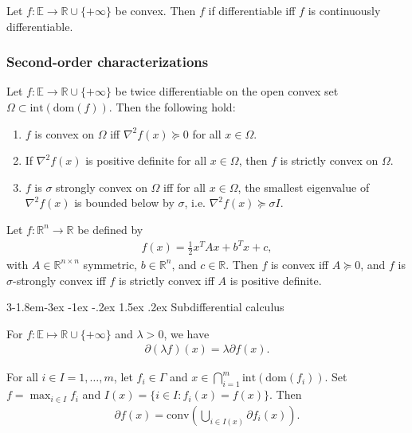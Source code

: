 \documentclass{tufte-handout}
\makeatletter
\renewcommand{\subsection}{\@startsection{subsection}%
    {3}{-1.8em}{-3ex \@plus -1ex \@minus -.2ex}%
    {1.5ex \@plus .2ex}
    {\hspace*{-5.5em}\fcolorbox{ltblue}{ltblue}{\parbox[c][1.0ex][b]{4em}{\phantom{space}}}
    \normalfont\large\itshape\color{ltblue}}}
\makeatother
\begin{document}
\begin{Corollary}
    Let \( f: \mathbb{E}\to \mathbb{R} \cup \{+\infty\} \) be convex. Then \( f \) 
    if differentiable iff \( f \) is continuously differentiable.
\end{Corollary}

\subsubsection{Second-order characterizations}
\begin{Theorem}
    Let \( f: \mathbb{E}\to \mathbb{R} \cup \{+\infty\} \) be twice differentiable 
    on the open convex set \( \Omega \subset \text{int}(\text{dom}(f)) \).
    Then the following hold:
    \begin{enumerate}
        \item \( f \) is convex on \( \Omega \) iff \( \nabla^2 f(x) \succeq 0 \) for all \( x \in \Omega \).
        \item If \( \nabla^2 f(x) \) is positive definite for all \( x \in \Omega \), then \( f \) is strictly convex on \( \Omega \).
        \item \( f \) is \( \sigma \) strongly convex on \( \Omega \) iff for all \( x \in \Omega \), 
        the smallest eigenvalue of \( \nabla^2 f(x) \) is bounded below by \( \sigma \), i.e. \( \nabla^2 f(x) \succeq \sigma I \).
    \end{enumerate}
\end{Theorem}
\begin{Corollary}
    Let \( f: \mathbb{R}^n \to \mathbb{R}\) be defined by 
    \begin{align}
        f(x) = \frac{1}{2} x^T A x + b^T x + c,
    \end{align}
    with \( A \in \mathbb{R}^{n\times n} \) symmetric, \( b \in \mathbb{R}^n \), and \( c \in \mathbb{R} \). Then \( f \) 
    is convex iff \( A \succeq 0 \), and \( f \) is \( \sigma \)-strongly convex iff \( f \) is 
    strictly convex iff \( A \) is positive definite.
\end{Corollary}

\subsection{Subdifferential calculus}
\begin{Proposition}
    For \( f:\mathbb{E}\mapsto \mathbb{R}\cup \{+\infty\} \) and \( \lambda > 0 \), we have
    \begin{align}
        \partial (\lambda f)(x) = \lambda \partial f(x).
    \end{align}
\end{Proposition}
\begin{Theorem}
    For all \( i \in I={1,\ldots,m} \), let \( f_i \in \Gamma\) and \( x \in \bigcap_{i=1}^m \text{int}(\text{dom}(f_i)) \).
    Set \( f = \max_{i\in I} f_i \) and \( I(x) = \{ i \in I : f_i(x) = f(x) \} \). Then
    \begin{align}
        \partial f(x) = \text{conv}\left( \bigcup_{i\in I(x)} \partial f_i(x) \right).
    \end{align}
\end{Theorem}
\end{document}
